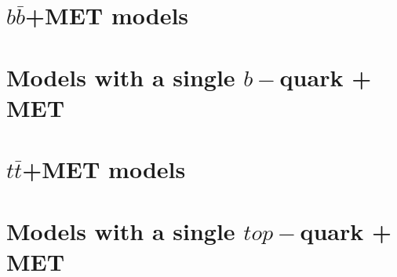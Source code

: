  \section{$b \bar{b}$+MET models}
 
 
 
 \section{Models with a single $b-$quark + MET}
 
 

\section{$t \bar{t}$+MET models}



 \section{Models with a single $top-$quark + MET}
 
 
